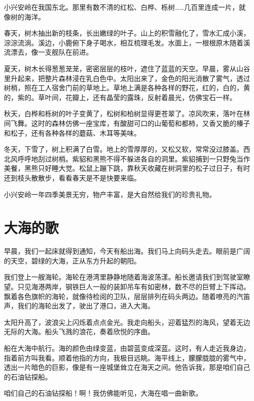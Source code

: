 \documentclass[12pt,UTF-8,openany]{ctexbook}
\begin{document}
\begin{large}
    
    小兴安岭在我国东北。那里有数不清的红松、白桦、栎树……几百里连成一片，就像树的海洋。
    
    春天，树木抽出新的枝条，长出嫩绿的叶子。山上的积雪融化了，雪水汇成小溪，淙淙流淌。溪边，小鹿俯下身子喝水，相互梳理毛发。水面上，一根根原木随着溪流漂去，像一支舰队在前进。
    
    夏天，树木长得葱葱茏茏，密密层层的枝叶，遮住了蓝蓝的天空。早晨，雾从山谷里升起来，把整片森林浸在乳白色中。太阳出来了，金色的阳光消散了雾气，透过树梢，照在工人宿舍门前的草地上。草地上满是各种各样的野花，红的，白的，黄的，紫的。草叶间，花瓣上，还有晶莹的露珠，反射着晨光，仿佛宝石一样。
    
    秋天，白桦和栎树的叶子变黄了，松树和柏树显得更苍翠了。凉风吹来，落叶在林间飞舞。这时的森林仿佛一座宝库，有酸甜可口的山葡萄和都柿，又香又脆的榛子和松子，还有各种各样的蘑菇、木耳等美味。
    
    冬天，下雪了，树上积满了白雪。地上的雪厚厚的，又松又软，常常没过膝盖。西北风呼呼地刮过树梢。紫貂和黑熊不得不躲进各自的洞里。紫貂捕到一只野兔当作美餐，黑熊只好睡大觉。松鼠上蹦下跳，靠秋天收藏在树洞里的松子过日子，有时还到枝头散散步，看看春天是不是快要来临。
    
    小兴安岭一年四季美景无穷，物产丰富，是大自然给我们的珍贵礼物。
    
\end{large}



\chapter{大海的歌}

\begin{large}
    
    早晨，我们一起床就得到通知，今天有船出海。我们马上向码头走去。眼前是广阔的天空，碧绿的大海，正从东方升起的朝阳。
    
    我们登上一艘海轮。海轮在港湾里静静地随着海波荡漾。船长邀请我们到驾驶室瞭望。只见海港两岸，钢铁巨人一般的装卸吊车有如密林，数不尽的巨臂上下挥动。飘着各色旗帜的海轮，就像待检阅的卫队，层层排列在码头两边。随着嘹亮的汽笛声，我们的海轮出发了，驶出了港口，进入大海。
    
    太阳升高了，波浪尖上闪烁着点点金光。我走向船头，迎着猛烈的海风，望着无边无际的大海。船头飞溅的浪花，奏着欣悦的序曲。
    
    船在大海中航行。海的颜色由绿变蓝，由碧蓝变成深蓝。这时，有人走近我身边，指着前方叫我看。顺着他指的方向，我极目远眺。海平线上，朦朦胧胧的雾气中，透出一片暗色的巨影，像是有一座城堡耸立在海天之间。他告诉我，那是咱们自己的石油钻探船。
    
    咱们自己的石油钻探船！啊！我仿佛能听见，大海在唱一曲新歌。
    
\end{large}
\end{document}
